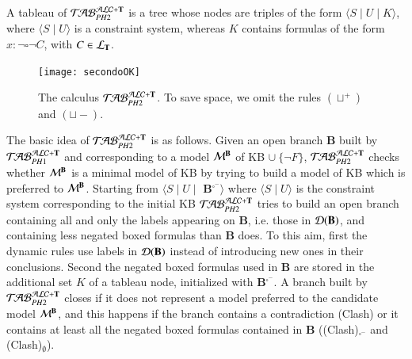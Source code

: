 \documentclass[a4paper, 11pt, oneside]{elsarticle}
\newcommand{\tip}{{\bf T}}
\newcommand{\hide}[1]{}
\newcommand{\unione} {\cup}
\newcommand{\vuoto} {\emptyset}
\newcommand{\nott} {\lnot}
\newcommand{\tc} {\mid}
\newcommand{\bbox}{\square}
\newcommand{\sx} {\langle}
\newcommand{\dx} {\rangle}
\newcommand{\db}{\mathcal{D}(\mbox{\bf B})}
\newcommand{\ellet} {\mathcal{L}_{\bf T}}
\newcommand{\emme} {\begin{mathcal}M\end{mathcal}}
\newcommand{\primo}{\mathrel{{\mathcal{T}\!\mathcal{AB}}}_{PH 1}^{\mathcal{ALC}+\mbox{\scriptsize $\tip$}}}
\newcommand{\secondo}{\mathrel{{\mathcal{T}\!\mathcal{AB}}}_{PH 2}^{\mathcal{ALC}+\mbox{\scriptsize $\tip$}}}
\begin{document}
\hide{\noindent Intuitively, $\db$ is the set of individual
constants and variables occurring in {\bf B}, whereas {\bf
B}$^{\bbox^{-}}$ is the set of formulas $x: \nott \bbox \nott C$
occurring in {\bf B}.}

\noindent  A tableau of $\secondo$ is a tree whose
nodes are triples of the form $\sx S \tc U \tc K \dx$, where $\sx S \tc U \dx$ is a constraint system, whereas $K$ contains formulas
of the form $x: \nott \bbox \nott C$, with $C \in \ellet$.




\begin{figure}[t]
{\centerline{
\texttt{[image: secondoOK]}} }  \caption{The calculus $\secondo$. To save space, we omit the rules $(\sqcup^+)$ and $(\sqcup-)$.}\label{immagine secondo}
\end{figure}




The basic idea of $\secondo$ is as follows. Given an open branch
{\bf B} built by $\primo$ and corresponding to a model $\emme^{\bf
B}$ of KB $\unione \ \{\nott F\}$, $\secondo$ checks whether
$\emme^{\bf B}$ is a minimal model of KB by trying to build a
model of KB which is preferred to $\emme^{\bf B}$. \hide{Checking
(un)satisfiability of , allows to verify whether the candidate
model $\emme^{\bf B}$ is minimal.} Starting from $\sx S \tc U \tc$
{\bf B}$^{\bbox^-} \dx$ where $\sx S \tc U \dx$ is the
 constraint system corresponding to the initial KB $\secondo$ tries
to build an open branch containing  all and only the labels
appearing on {\bf B}, i.e. those in $\db$, and containing less
negated boxed formulas than {\bf B} does. To this aim, first the
dynamic rules use labels in $\db$ instead of introducing new ones
in their conclusions. Second the negated boxed formulas used in
{\bf B} are stored in  the additional set $K$ of a tableau node,
initialized with {\bf B}$^{\bbox^-}$. \hide{, is used in order to
ensure that any branch {\bf B'} built by $\secondo$ is preferred
to {\bf B}, that is {\bf B'} only contains  negated boxed formulas
occurring in {\bf B} and there exists at least a $x: \nott \bbox
\nott C$ that occurs in {\bf B} and \emph{does not occur} in {\bf
B'}.} A branch built by $\secondo$ closes if it does not represent
a model preferred to the candidate model $\emme^{\bf B}$, and this
happens if the branch contains a contradiction (Clash) or it
contains at least all the negated boxed formulas contained in {\bf
B} ((Clash)$_{\bbox^{-}}$ and (Clash)$_{\vuoto}$).
\end{document}

